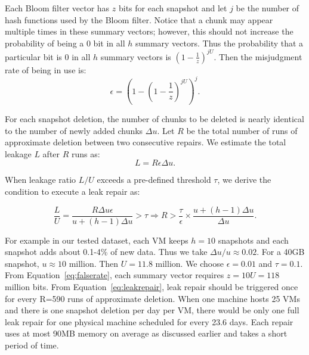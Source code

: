 Each Bloom filter vector has  $z$ bits for each snapshot and let $j$ be the number of hash functions used by the
Bloom filter.  Notice that a chunk may appear multiple times in these summary vectors; however, this should not 
increase the probability of being a 0 bit in all $h$ summary vectors.
Thus the probability that a particular bit is 0  in all $h$ summary vectors is  
$(1- \frac{1}{z}) ^{j U}$. 
Then the misjudgment rate of being in use  is: 
\begin{equation}
\label{eq:falserate}
\epsilon = (1-(1-\frac{1}{z})^{jU})^j.
\end{equation}

For each snapshot deletion, the number of chunks to be deleted is nearly identical to the number of
newly added chunks $\Delta u$. 
Let $R$ be the total number of runs of approximate deletion between two consecutive 
repairs. We estimate  the total leakage $L$ after $R$ runs as:
\[
L = R \epsilon \Delta u.
\]

When leakage ratio $L/U$ exceeds a pre-defined threshold $\tau$, we derive the condition to execute a leak repair as:

\begin{equation}
\label{eq:leakrepair}
\frac{L}{U} = \frac{R \Delta u \epsilon}{u+(h-1)\Delta u } > \tau 
\Longrightarrow R > \frac{\tau}{\epsilon}\times\frac{u + (h-1)\Delta u}{\Delta u}.
\end{equation}

For example in our tested dataset,  
each VM keeps $h=10$ snapshots and each snapshot adds
about 0.1-4\% of new data. Thus we take ${\Delta u}/{u} \approx 0.02$. For a 40GB snapshot, $u\approx  10$ million.
Then $U=11.8$ million.
We choose  $\epsilon = 0.01$ and $\tau=0.1$.  From Equation~\ref{eq:falserate}, 
each summary vector requires $z=10U=118$ million bits. From Equation~\ref{eq:leakrepair}, 
leak repair should be triggered once for every R=590 runs of approximate deletion. 
When one machine hosts 25 VMs and there is one snapshot deletion per day per VM, there would be 
only one full leak repair for one physical machine scheduled for every 23.6 days. 
Each repair uses at most  90MB memory on average
as discussed earlier and takes a short period of time.

